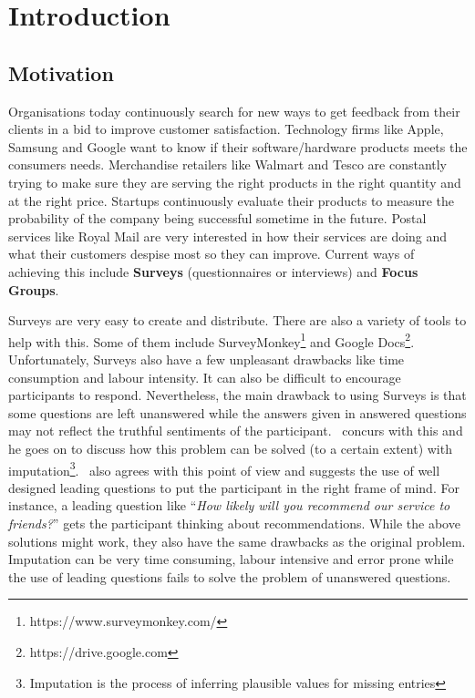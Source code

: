 
\chapter{Introduction}
\label{cha:introduction}

\section{Motivation}
\label{sec:motivation}
Organisations today continuously search for new ways to get feedback from their clients in a bid to
improve customer satisfaction. Technology firms like Apple, Samsung and Google want to know if their
software/hardware products meets the consumers needs. Merchandise retailers like Walmart and Tesco
are constantly trying to make sure they are serving the right products in the right quantity and at
the right price. Startups continuously evaluate their products to measure the probability of the
company being successful sometime in the future. Postal services like Royal Mail are very interested
in how their services are doing and what their customers despise most so they can improve. Current
ways of achieving this include \textbf{Surveys} (questionnaires or interviews) and \textbf{Focus
Groups}.

Surveys are very easy to create and distribute. There are also a variety of tools to help with this.
Some of them include SurveyMonkey\footnote{https://www.surveymonkey.com/} and Google
Docs\footnote{https://drive.google.com}. Unfortunately, Surveys also have a few unpleasant drawbacks
like time consumption and labour intensity. It can also be difficult to encourage participants to
respond. Nevertheless, the main drawback to using Surveys is that some questions are left unanswered
while the answers given in answered questions may not reflect the truthful sentiments of the
participant.~\cite{rubin1987} concurs with this and he goes on to discuss how this problem can be
solved (to a certain extent) with imputation\footnote{Imputation is the process of inferring
plausible values for missing entries}.~\cite{hayes2008} also agrees with this point of view and
suggests the use of well designed leading questions to put the participant in the right frame of
mind. For instance, a leading question like ``\textit{How likely will you recommend our service to
friends?}'' gets the participant thinking about recommendations. While the above solutions might
work, they also have the same drawbacks as the original problem. Imputation can be very time
consuming, labour intensive and error prone while the use of leading questions fails to solve the
problem of unanswered questions.

